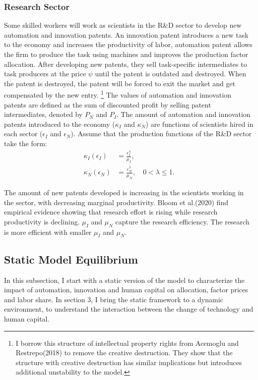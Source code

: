 \documentclass[12pt]{article}
\begin{document}
\subsubsection*{Research Sector}
Some skilled workers will work as scientists in the R\&D sector to develop new automation and innovation patents. An innovation patent introduces a new task to the economy and increases the productivity of labor, automation patent allows the firm to produce the task using machines and improves the production factor allocation. After developing new patents, they sell task-specific intermediates to task producers at the price $\psi$ until the patent is outdated and destroyed. When the patent is destroyed, the patent will be forced to exit the market and get compensated by the new entry. \footnote{I borrow this structure of intellectual property rights from Acemoglu and Restrepo(2018)\nocite{AcemogluRestrepo2018} to remove the creative destruction. They show that the structure with creative destruction has similar implications but introduces additional unstability to the model.} The values of automation and innovation patents are defined as the sum of discounted profit by selling patent intermediates, denoted by $P_N$ and $P_I$. The amount of automation and innovation patents introduced to the economy ($\kappa_I$ and $\kappa_N$) are functions of scientists hired in each sector ($\epsilon_I$ and $\epsilon_N$).
Assume that the production functions of the R\&D sector take the form: 
\begin{align*}
\kappa_I(\epsilon_I) &= \frac{\epsilon_I^\lambda}{\mu_I}, \\
\kappa_N(\epsilon_N) &= \frac{\epsilon_N^\lambda}{\mu_N}, \quad 0<\lambda\leq 1.
\end{align*}

The amount of new patents developed is increasing in the scientists working in the sector, with decreasing marginal productivity. Bloom et al.(2020)\nocite{Bloometal2020} find empirical evidence showing that research effort is rising while research productivity is declining. $\mu_I$ and $\mu_N$ capture the research efficiency. The research is more efficient with smaller $\mu_I$ and $\mu_N$. 

\subsection{Static Model Equilibrium}
In this subsection, I start with a static version of the model to characterize the impact of automation, innovation and human capital on allocation, factor prices and labor share. In section 3, I bring the static framework to a dynamic environment, to understand the interaction between the change of technology and human capital. 
\end{document}
